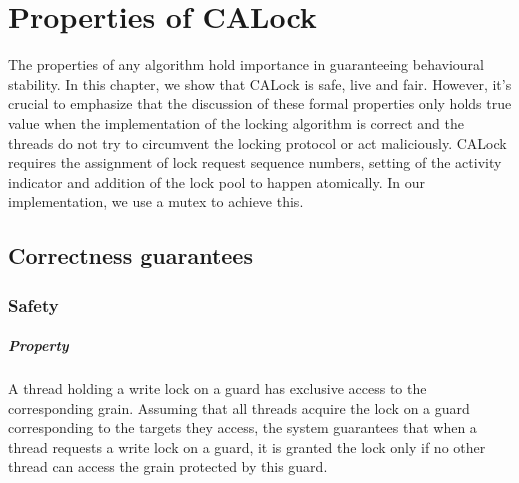 \chapter{Properties of CALock} \label{chap:formalProperties}

\minitoc
The properties of any algorithm hold importance in guaranteeing behavioural stability. In this chapter, we show that CALock is safe, live and fair. 
However, it's crucial to emphasize that the discussion of these formal properties only holds true value when the implementation of the locking algorithm is correct and the threads do not try to circumvent the locking protocol or act maliciously. 
CALock requires the assignment of lock request sequence numbers, setting of the activity indicator and addition of the lock pool to happen atomically. 
In our implementation, we use a mutex to achieve this. 
%
\section{Correctness guarantees}

\subsection[Safety]{Safety}


\paragraph{Property} A thread holding a write lock on a guard has exclusive access to the corresponding grain. Assuming that all threads acquire the lock on a guard corresponding to the targets they access, the system guarantees that when a thread requests a write lock on a guard, it is granted the lock only if no other thread can access the grain protected by this guard.

